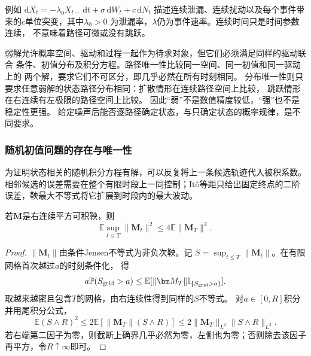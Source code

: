 例如
$\mathrm dX_t=-\lambda_0X_{t-}\,\mathrm dt+\sigma\,\mathrm dW_t
                         +c\,\mathrm dN_t$
描述连续泄漏、连续扰动以及每个事件带来的$c$单位突变，其中$\lambda_0>0$
为泄漏率，$\lambda$仍为事件速率。连续时间只是时间参数连续，
不意味着路径可微或没有跳跃。

弱解允许概率空间、驱动和过程一起作为待求对象，但它们必须满足同样的驱动联合
条件、初值分布及积分方程。路径唯一性比较同一空间、同一初值和同一驱动上的
两个解，要求它们不可区分，即几乎必然在所有时刻相同。
分布唯一性则只要求任意弱解的状态路径分布相同：扩散情形在连续路径空间上比较，
跳跃情形在右连续有左极限的路径空间上比较。
因此“弱”不是数值精度较低，“强”也不是稳定性更强。
给定噪声后能否逐路径确定状态，与只确定状态的概率规律，是不同要求。

\subsubsection{随机初值问题的存在与唯一性}
为证明状态相关的随机积分方程有解，可以反复将上一条候选轨迹代入被积系数。相邻候选的误差需要在整个有限时段上一同控制；Itô等距只给出固定终点的二阶误差，鞅最大不等式将它扩展到时段内的最大波动。
\begin{lemma}[二阶鞅最大不等式]
 \label{lem:action-state-doob-l2}
 若$\bm M$是右连续平方可积鞅，则
 \[
   \mathbb E\sup_{t\leq T}\|\bm M_t\|^2
      \leq4\mathbb E\|\bm M_T\|^2.
 \]
\end{lemma}
\begin{proof}
 $\|\bm M_t\|$由条件Jensen不等式为非负次鞅。记
 $S=\sup_{t\leq T}\|\bm M_t\|$。在有限网格首次越过$a$的时刻条件化，
 得
 \[
  a\mathbb P(S_{\rm grid}>a)
    \leq\mathbb E[\|\bm M_T\|\mathbb I_{\{S_{\rm grid}>a\}}].
 \]
 取越来越密且包含$T$的网格，由右连续性得到同样的$S$不等式。
 对$a\in[0,R]$积分并用尾积分公式，
 \[
  \mathbb E(S\wedge R)^2
    \leq2\mathbb E[\|\bm M_T\|(S\wedge R)]
    \leq2\|\bm M_T\|_{L^2}\|S\wedge R\|_{L^2}.
 \]
 若右端第二因子为零，则截断上确界几乎必然为零，左侧也为零；否则除去该因子再平方，令$R\uparrow\infty$即可。
\end{proof}

